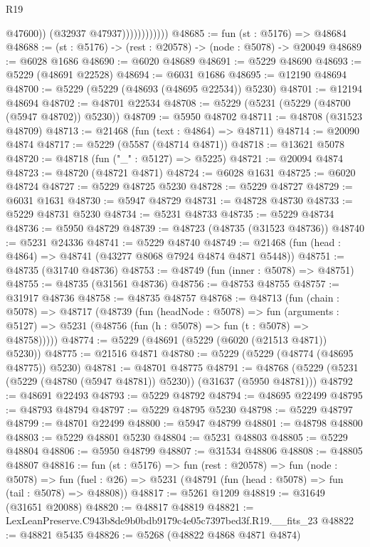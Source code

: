 \begin{lexlean}{R19}
\begin{coremodule}
                              @47600))
                          (@32937 @47937))))))))))))
@48685 := fun (st : @5176) => @48684
@48688 := (st : @5176) -> (rest : @20578) -> (node : @5078) -> @20049
@48689 := @6028 @1686
@48690 := @6020 @48689
@48691 := @5229 @48690
@48693 := @5229 (@48691 @22528)
@48694 := @6031 @1686
@48695 := @12190 @48694
@48700 := @5229 (@5229 (@48693 (@48695 @22534)) @5230)
@48701 := @12194 @48694
@48702 := @48701 @22534
@48708 := @5229 (@5231 (@5229 (@48700 (@5947 @48702)) @5230))
@48709 := @5950 @48702
@48711 := @48708 (@31523 @48709)
@48713 := @21468 (fun (text : @4864) => @48711)
@48714 := @20090 @4874
@48717 := @5229 (@5587 (@48714 @4871))
@48718 := @13621 @5078
@48720 := @48718 (fun ("_" : @5127) => @5225)
@48721 := @20094 @4874
@48723 := @48720 (@48721 @4871)
@48724 := @6028 @1631
@48725 := @6020 @48724
@48727 := @5229 @48725 @5230
@48728 := @5229 @48727
@48729 := @6031 @1631
@48730 := @5947 @48729
@48731 := @48728 @48730
@48733 := @5229 @48731 @5230
@48734 := @5231 @48733
@48735 := @5229 @48734
@48736 := @5950 @48729
@48739 := @48723 (@48735 (@31523 @48736))
@48740 := @5231 @24336
@48741 := @5229 @48740
@48749 := @21468 (fun (head : @4864) => @48741 (@43277 @8068 @7924 @4874 @4871 @5448))
@48751 := @48735 (@31740 @48736)
@48753 := @48749 (fun (inner : @5078) => @48751)
@48755 := @48735 (@31561 @48736)
@48756 := @48753 @48755
@48757 := @31917 @48736
@48758 := @48735 @48757
@48768 := @48713
    (fun (chain : @5078) =>
    @48717
      (@48739
        (fun (headNode : @5078) =>
        fun (arguments : @5127) => @5231 (@48756 (fun (h : @5078) => fun (t : @5078) => @48758)))))
@48774 := @5229 (@48691 (@5229 (@6020 (@21513 @4871)) @5230))
@48775 := @21516 @4871
@48780 := @5229 (@5229 (@48774 (@48695 @48775)) @5230)
@48781 := @48701 @48775
@48791 := @48768 (@5229 (@5231 (@5229 (@48780 (@5947 @48781)) @5230)) (@31637 (@5950 @48781)))
@48792 := @48691 @22493
@48793 := @5229 @48792
@48794 := @48695 @22499
@48795 := @48793 @48794
@48797 := @5229 @48795 @5230
@48798 := @5229 @48797
@48799 := @48701 @22499
@48800 := @5947 @48799
@48801 := @48798 @48800
@48803 := @5229 @48801 @5230
@48804 := @5231 @48803
@48805 := @5229 @48804
@48806 := @5950 @48799
@48807 := @31534 @48806
@48808 := @48805 @48807
@48816 := fun (st : @5176) =>
  fun (rest : @20578) =>
  fun (node : @5078) =>
  fun (fuel : @26) => @5231 (@48791 (fun (head : @5078) => fun (tail : @5078) => @48808))
@48817 := @5261 @1209
@48819 := @31649 (@31651 @20088)
@48820 := @48817 @48819
@48821 := LexLeanPreserve.C943b8de9b0bdb9179c4e05c7397bed3f.R19.__fits_23
@48822 := @48821 @5435
@48826 := @5268 (@48822 @4868 @4871 @4874)

\end{coremodule}
\end{lexlean}

